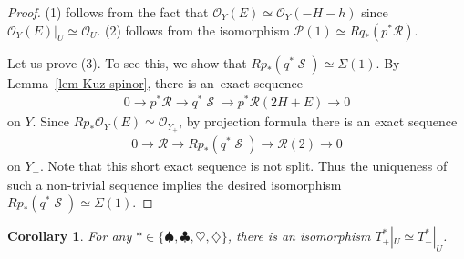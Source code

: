 \documentclass[11pt]{article}
\DeclareMathOperator{\Spi}{\mathcal{S}}
\newcommand{\stsh}{\mathcal{O}}
\numberwithin{equation}{section}
\newtheorem{Corollary}[Theorem]{Corollary}
\begin{document}
\begin{proof}
(1) follows from the fact that $\stsh_Y(E) \simeq \stsh_Y(-H-h)$ since $\stsh_Y(E)|_U \simeq \stsh_U$.
(2) follows from the isomorphism $\mathcal{P}(1) \simeq Rq_*(p^*\mathcal{R})$.

Let us prove (3).
To see this, we show that $Rp_*(q^*\Spi) \simeq \Sigma(1)$.
By Lemma~\ref{lem Kuz spinor}, there is an~exact sequence
\begin{gather*}
0 \to p^*\mathcal{R} \to q^* \Spi \to p^* \mathcal{R}(2H+E) \to 0
\end{gather*}
on $Y$.
Since $Rp_*\stsh_Y(E) \simeq \stsh_{Y_+}$, by projection formula there is an exact sequence
\begin{gather*}
0 \to \mathcal{R} \to Rp_*(q^* \Spi) \to \mathcal{R}(2) \to 0
\end{gather*}
on $Y_+$.
Note that this short exact sequence is not split.
Thus the uniqueness of such a non-trivial sequence implies the desired isomorphism $Rp_*(q^*\Spi) \simeq \Sigma(1)$.
\end{proof}

\begin{Corollary}
For any $\ast \in \{ \spadesuit, \clubsuit, \heartsuit, \diamondsuit \}$, there is an isomorphism $T_+^{\ast}|_U \simeq T_-^{\ast}|_U$.
\end{Corollary}
\end{document}
